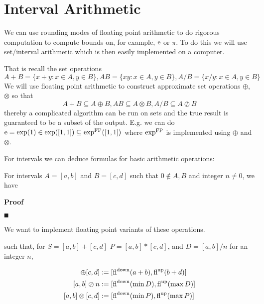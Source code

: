 
\section{Interval Arithmetic}
We can use rounding modes of floating point arithmetic to do rigorous computation to compute bounds on, for example, ${\rm e}$ or $\ensuremath{\pi}$. To do this we will use set/interval arithmetic which is then easily implemented on a computer. 

That is recall the set operations
\[
A + B = \{x + y : x \ensuremath{\in} A, y \ensuremath{\in} B\}, AB = \{xy : x \ensuremath{\in} A, y \ensuremath{\in} B\}, A/B = \{x/y : x \ensuremath{\in} A, y \ensuremath{\in} B\}
\]
We will use floating point arithmetic to construct approximate set operations \ensuremath{\oplus}, \ensuremath{\otimes} so that
\[
  A + B \ensuremath{\subseteq} A \ensuremath{\oplus} B, AB \ensuremath{\subseteq} A \ensuremath{\otimes} B, A/B \ensuremath{\subseteq} A \ensuremath{\oslash} B
\]
thereby a complicated algorithm can be run on sets and the true result is guaranteed to be a subset of the output. E.g. we can do ${\rm e} = {\rm exp}(1) \in {\rm exp}([1,1]) \subseteq {\rm exp}^{\rm FP}([1,1])$ where ${\rm exp}^{\rm FP}$ is implemented using $\ensuremath{\oplus}$ and $\ensuremath{\otimes}$.

For intervals we can deduce formulas for basic arithmetic operations:

\begin{proposition} For intervals  $A = [a,b]$ and $B = [c,d]$ such that $0 \ensuremath{\notin} A,B$ and integer $n \ensuremath{\neq} 0$, we have
\end{proposition}
\textbf{Proof}

\ensuremath{\QED}

We want to  implement floating point variants of these operations. 

\begin{definition}  such that, for $S = [a,b] + [c,d]$  $P = [a,b] * [c,d]$, and $D = [a,b]/n$ for an integer $n$,


\begin{align*}
[a,b] \ensuremath{\oplus} [c,d] &:= [{\rm fl}^{\rm down}(a+b), {\rm fl}^{\rm up}(b+d)] \\
[a,b] \ensuremath{\oslash} n &:= [{\rm fl}^{\rm down}(\min D), {\rm fl}^{\rm up}(\max D)] \\
[a,b] \ensuremath{\otimes} [c,d] &:= [{\rm fl}^{\rm down}(\min P), {\rm fl}^{\rm up}(\max P)]
\end{align*}
\end{definition}


